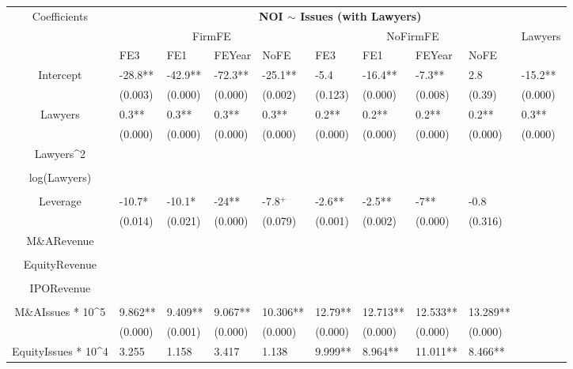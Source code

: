 \documentclass{article}
\begin{document}
\begin{table}[H]
\centering
\begin{tabular}{|clllllllll|}
\hline
\multirow{3}{*}{Coefficients} & \multicolumn{9}{c|}{\textbf{NOI $\sim$ Issues (with Lawyers)}} \\
\cline{2-10}
& \multicolumn{4}{c}{FirmFE} & \multicolumn{4}{c}{NoFirmFE} & \multirow{2}{*}{Lawyers} \\
\cline{2-9}
& FE3 & FE1 & FEYear & NoFE & FE3 & FE1 & FEYear & NoFE &  \\
\hline
 
Intercept & -28.8** & -42.9** & -72.3** & -25.1** & -5.4 & -16.4** & -7.3** & 2.8 & -15.2** \\ 
   & (0.003) & (0.000) & (0.000) & (0.002) & (0.123) & (0.000) & (0.008) & (0.39) & (0.000) \\ 
  Lawyers & 0.3** & 0.3** & 0.3** & 0.3** & 0.2** & 0.2** & 0.2** & 0.2** & 0.3** \\ 
   & (0.000) & (0.000) & (0.000) & (0.000) & (0.000) & (0.000) & (0.000) & (0.000) & (0.000) \\ 
  Lawyers^2 &  &  &  &  &  &  &  &  &  \\ 
   &  &  &  &  &  &  &  &  &  \\ 
  log(Lawyers) &  &  &  &  &  &  &  &  &  \\ 
   &  &  &  &  &  &  &  &  &  \\ 
  Leverage & -10.7* & -10.1* & -24** & -7.8$^{+}$ & -2.6** & -2.5** & -7** & -0.8 &  \\ 
   & (0.014) & (0.021) & (0.000) & (0.079) & (0.001) & (0.002) & (0.000) & (0.316) &  \\ 
  M\&ARevenue &  &  &  &  &  &  &  &  &  \\ 
   &  &  &  &  &  &  &  &  &  \\ 
  EquityRevenue &  &  &  &  &  &  &  &  &  \\ 
   &  &  &  &  &  &  &  &  &  \\ 
  IPORevenue &  &  &  &  &  &  &  &  &  \\ 
   &  &  &  &  &  &  &  &  &  \\ 
  M\&AIssues * 10^5 & 9.862** & 9.409** & 9.067** & 10.306** & 12.79** & 12.713** & 12.533** & 13.289** &  \\ 
   & (0.000) & (0.001) & (0.000) & (0.000) & (0.000) & (0.000) & (0.000) & (0.000) &  \\ 
  EquityIssues * 10^4 & 3.255 & 1.158 & 3.417 & 1.138 & 9.999** & 8.964** & 11.011** & 8.466** &  \\ 

\end{tabular}
\end{table}
\end{document}
